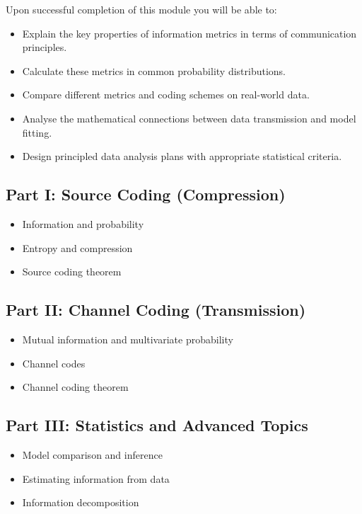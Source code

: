 Upon successful completion of this module you will be able to:

\begin{itemize}
    \item Explain the key properties of information metrics in terms of communication principles.
    \item Calculate these metrics in common probability distributions.
    \item Compare different metrics and coding schemes on real-world data.
    \item Analyse the mathematical connections between data transmission and model fitting.
    \item Design principled data analysis plans with appropriate statistical criteria.
\end{itemize}

\subsection*{Part I: Source Coding (Compression)}
\begin{itemize}
    \item Information and probability
    \item Entropy and compression
    \item Source coding theorem
\end{itemize}

\subsection*{Part II: Channel Coding (Transmission)}
\begin{itemize}
    \item Mutual information and multivariate probability
    \item Channel codes
    \item Channel coding theorem
\end{itemize}

\subsection*{Part III: Statistics and Advanced Topics}
\begin{itemize}
    \item Model comparison and inference
    \item Estimating information from data
    \item Information decomposition
\end{itemize}


